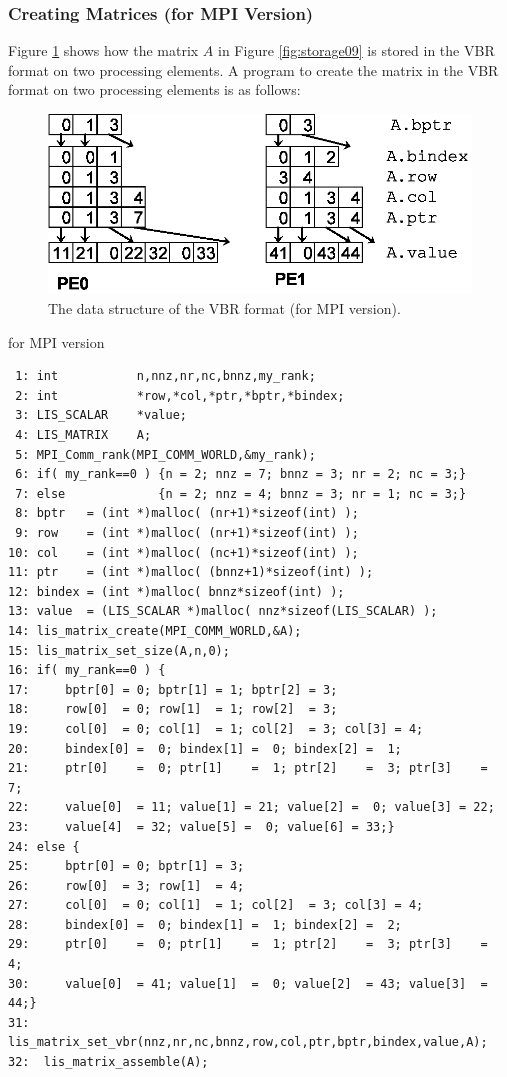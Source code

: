 \documentclass[a4paper]{article}
\begin{document}
\subsubsection{Creating Matrices (for MPI Version)}
Figure \ref{fig:storage09_mpi} shows how the matrix $A$ in Figure \ref{fig:storage09} is stored in the VBR format on two processing elements. A program to create the matrix in the VBR format on two processing elements is as follows:
\begin{figure}[h]
{\centering 
\includegraphics{storage09_mpi.eps} 
\caption{The data structure of the VBR format (for MPI version).}\label{fig:storage09_mpi}}
\end{figure}
\begin{itembox}[l]{for MPI version}
\small
\begin{verbatim}
 1: int           n,nnz,nr,nc,bnnz,my_rank;
 2: int           *row,*col,*ptr,*bptr,*bindex;
 3: LIS_SCALAR    *value;
 4: LIS_MATRIX    A;
 5: MPI_Comm_rank(MPI_COMM_WORLD,&my_rank);
 6: if( my_rank==0 ) {n = 2; nnz = 7; bnnz = 3; nr = 2; nc = 3;}
 7: else             {n = 2; nnz = 4; bnnz = 3; nr = 1; nc = 3;}
 8: bptr   = (int *)malloc( (nr+1)*sizeof(int) );
 9: row    = (int *)malloc( (nr+1)*sizeof(int) );
10: col    = (int *)malloc( (nc+1)*sizeof(int) );
11: ptr    = (int *)malloc( (bnnz+1)*sizeof(int) );
12: bindex = (int *)malloc( bnnz*sizeof(int) );
13: value  = (LIS_SCALAR *)malloc( nnz*sizeof(LIS_SCALAR) );
14: lis_matrix_create(MPI_COMM_WORLD,&A);
15: lis_matrix_set_size(A,n,0);
16: if( my_rank==0 ) {
17:     bptr[0] = 0; bptr[1] = 1; bptr[2] = 3;
18:     row[0]  = 0; row[1]  = 1; row[2]  = 3;
19:     col[0]  = 0; col[1]  = 1; col[2]  = 3; col[3] = 4;
20:     bindex[0] =  0; bindex[1] =  0; bindex[2] =  1;
21:     ptr[0]    =  0; ptr[1]    =  1; ptr[2]    =  3; ptr[3]    =  7;
22:     value[0]  = 11; value[1] = 21; value[2] =  0; value[3] = 22;
23:     value[4]  = 32; value[5] =  0; value[6] = 33;}
24: else {
25:     bptr[0] = 0; bptr[1] = 3;
26:     row[0]  = 3; row[1]  = 4;
27:     col[0]  = 0; col[1]  = 1; col[2]  = 3; col[3] = 4;
28:     bindex[0] =  0; bindex[1] =  1; bindex[2] =  2;
29:     ptr[0]    =  0; ptr[1]    =  1; ptr[2]    =  3; ptr[3]    =  4;
30:     value[0]  = 41; value[1]  =  0; value[2]  = 43; value[3]  = 44;}
31:  lis_matrix_set_vbr(nnz,nr,nc,bnnz,row,col,ptr,bptr,bindex,value,A);
32:  lis_matrix_assemble(A);
\end{verbatim}
\end{itembox}
\end{document}
